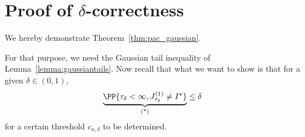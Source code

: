 \section{Proof of \texorpdfstring{$\delta$-}{}correctness}\label{app:pac_gaussian}

We hereby demonstrate Theorem~\ref{thm:pac_gaussian}. 

\restatepac*

For that purpose, we need the Gaussian tail inequality of Lemma~\ref{lemma:gaussiantails}. Now recall that what we want to show is that for a given $\delta\in (0,1)$,
\begin{equation*}
    \underbrace{\PP{\tau_{\delta} < \infty, J_{\tau_{\delta}}^{(1)} \neq I^\star}}_\text{(*)} \leq \delta
\end{equation*}
for a certain threshold $c_{n,\delta}$ to be determined.

